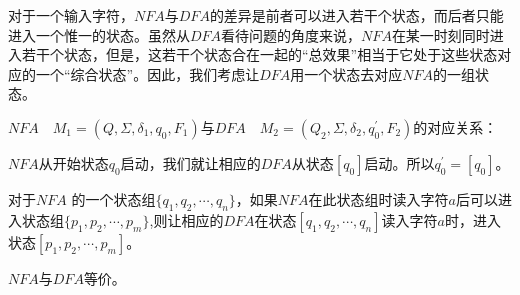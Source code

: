 对于一个输入字符，$NFA$与$DFA$的差异是前者可以进入若干个状态，而后者只能进入一个惟一的状态。虽然从$DFA$看待问题的角度来说，$NFA$在某一时刻同时进入若干个状态，但是，这若干个状态合在一起的“总效果”相当于它处于这些状态对应的一个“综合状态”。因此，我们考虑让$DFA$用一个状态去对应$NFA$的一组状态。 

$NFA\quad M_1=(Q,\Sigma,\delta_1,q_0,F_1)$与$DFA\quad M_2=(Q_2,\Sigma,\delta_2,q_0^\prime,F_2)$的对应关系：

$NFA$从开始状态$q_0$启动，我们就让相应的$DFA$从状态$[q_0]$启动。所以$q_0^\prime=[ q_0]$。 

对于$NFA$ 的一个状态组$\{q_1,q_2,\cdots,q_n\}$，如果$NFA$在此状态组时读入字符$a$后可以进入状态组$\{p_1,p_2,\cdots,p_m\}$,则让相应的$DFA$在状态$[q_1,q_2,\cdots,q_n]$读入字符$a$时，进入状态$[p_1,p_2,\cdots,p_m]$。  

\begin{theorem}
	$NFA$与$DFA$等价。
\end{theorem}


